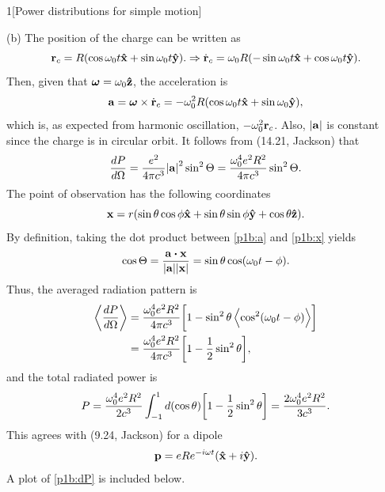 \documentclass[12pt]{article}
\begin{document}
\begin{problem}{1}[Power distributions for simple motion]
\begin{solution}
(b) The position of the charge can be written as
\begin{equation}
    \vb{r}_c=R(\cos\omega_0t\vb{\hat{x}}+\sin\omega_0t\vb{\hat{y}}).
    \Rightarrow \dot{\vb{r}}_c
    =\omega_0R(-\sin\omega_0t\vb{\hat{x}}+\cos\omega_0t\vb{\hat{y}}).
\end{equation}
Then, given that $\bm\omega=\omega_0\vb{\hat{z}}$, the acceleration is
\begin{equation}\label{p1b:a}
    \vb{a}=\bm\omega\times\dot{\vb{r}}_c 
    =-\omega_0^2R(\cos\omega_0t\vb{\hat{x}}+\sin\omega_0\vb{\hat{y}}),
\end{equation}
which is, as expected from harmonic oscillation, $-\omega_0^2\vb{r}_c$. Also,
$\abs{\vb{a}}$ is constant since the charge is in circular orbit. It follows
from (14.21, Jackson) that
\begin{equation}
    \frac{dP}{d\Omega}=\frac{e^2}{4\pi c^3}\abs{\vb{a}}^2\sin^2\Theta
    =\frac{\omega_0^4e^2R^2}{4\pi c^3}\sin^2\Theta.
\end{equation}
The point of observation has the following coordinates
\begin{equation}\label{p1b:x}
    \vb{x}=r\qty(\sin\theta\cos\phi\vb{\hat{x}}+\sin\theta\sin\phi\vb{\hat{y}}+\cos\theta\vb{\hat{z}}). 
\end{equation}
By definition, taking the dot product between \eqref{p1b:a} and \eqref{p1b:x} 
yields
\begin{equation}
    \cos\Theta=\frac{\vb{a}\vdot\vb{x}}{\abs{\vb{a}}\abs{\vb{x}}}
    =\sin\theta\cos(\omega_0t-\phi).
\end{equation}
Thus, the averaged radiation pattern is
\begin{align}\label{p1b:dP}
    \expval{\frac{dP}{d\Omega}}
    &=\frac{\omega_0^4e^2R^2}{4\pi
    c^3}\qty[1-\sin^2\theta\expval{\cos^2(\omega_0t-\phi)}]\notag\\
    &=\frac{\omega_0^4e^2R^2}{4\pi c^3}
    \qty[1-\frac12\sin^2\theta],
\end{align}
and the total radiated power is
\begin{equation}
    P=\frac{\omega_0^4e^2R^2}{2
    c^3}\int_{-1}^1d(\cos\theta)\qty[1-\frac12\sin^2\theta]
    =\frac{2\omega_0^4e^2R^2}{3c^3}.
\end{equation}
This agrees with (9.24, Jackson) for a dipole
\begin{equation}
    \vb{p}=eRe^{-i\omega t}\qty(\vb{\hat{x}}+i\vb{\hat{y}}). 
\end{equation}
A plot of \eqref{p1b:dP} is included below.
\begin{center}

\end{center}
\end{solution}
\end{problem}
\end{document}
